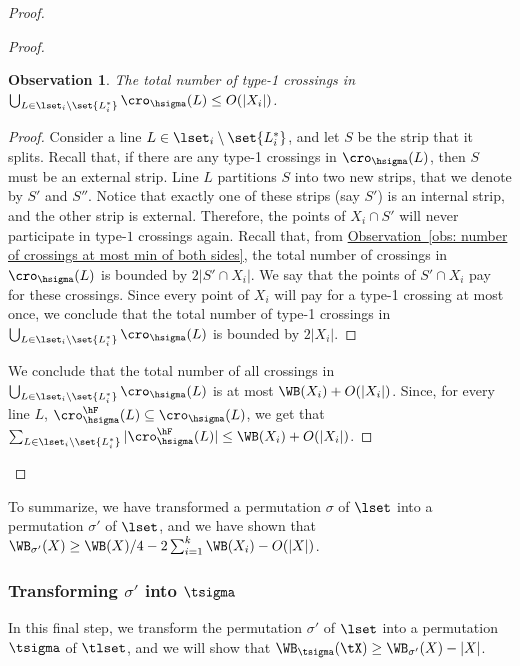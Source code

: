 \documentclass[11pt]{article}
\numberwithin{equation}{section}
\theoremstyle{definition}
\theoremstyle{plain}
\newcommand{\expref}[2]{\hyperref[#2]{#1~\ref{#2}}}
\newtheorem{myobs}[theorem]{Observation}
\begin{document}
\begin{proof}
\begin{proof}
		
		\begin{myobs}\label{obs: type 1 crossings}
			The total number of type-1 crossings in $\bigcup_{L\in \lset_i\setminus\set{L_i^*}}\cro_{\hsigma}(L)\leq O(|X_i|)$.
		\end{myobs}
		\begin{proof}
			Consider a line $L\in \lset_i\setminus\set{L_i^*}$, and let $S$ be the strip that it splits. Recall that, if there are any type-1 crossings in $\cro_{\hsigma}(L)$, then $S$ must be an external strip. Line $L$ partitions $S$ into two new strips, that we denote by $S'$ and $S''$. Notice that exactly one of these strips (say $S'$) is an internal strip, and the other strip is external. Therefore, the points of $X_i\cap S'$ will never participate in type-$1$ crossings again. Recall that, from \expref{Observation}{obs: number of crossings at most min of both sides}, the total number of crossings in $\cro_{\hsigma}(L)$ is bounded by $2|S'\cap X_i|$. We say that the points of $S'\cap X_i$ pay for these crossings. Since every point of $X_i$ will pay for a type-1 crossing at most once, we conclude that the total number of type-1 crossings in $\bigcup_{L\in \lset_i\setminus\set{L_i^*}}\cro_{\hsigma}(L)$ is bounded by $2|X_i|$.
		\end{proof}
		
		We conclude that the total number of all crossings in $\bigcup_{L\in \lset_i\setminus\set{L_i^*}}\cro_{\hsigma}(L)$ is at most $\WB(X_i)+O(|X_i|)$. Since, for every line $L$, $\cro_{\hsigma}^{\hF}(L)\subseteq \cro_{\hsigma}(L)$, we get that $\sum_{L\in \lset_i\setminus\set{L_i^*}}|\cro^{\hF}_{\hsigma}(L)|\leq \WB(X_i)+O(|X_i|)$.
	\end{proof}			
\end{proof}


To summarize, we have transformed a permutation $\sigma$ of $\lset$ into a permutation $\sigma'$ of $\lset$, and we have shown that  $\WB_{\sigma'}(X)\geq \WB(X)/4-2\sum_{i=1}^k\WB(X_i)-O(|X|)$.


\subsubsection{Transforming $\sigma'$ into $\tsigma$}


In this final step, we transform the permutation $\sigma'$ of $\lset$ into a permutation $\tsigma$ of $\tlset$, and we will show that $\WB_{\tsigma}(\tX)\geq \WB_{\sigma'}(X)-|X|$.
\end{document}
